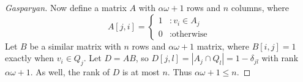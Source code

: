 \documentclass[12pt, a4paper]{book}
\theoremstyle{nonumberplain}
\newtheorem{proof}{Proof}
\begin{document}
\begin{proof}[Gasparyan]
    Now define a matrix $A$ with $\alpha\omega+1$ rows and $n$ columns, where
    \[A[j,i]=
        \begin{cases}
            1 &: v_i\in A_j\\
            0 &:\text{otherwise}
        \end{cases}
    \]
    Let $B$ be a similar matrix with $n$ rows and $\alpha\omega+1$ matrix, where $B[i,j]=1$ exactly when $v_i\in Q_j$.
    Let $D=AB$, so $D[j,l]=|A_j\cap Q_l|=1-\delta_{jl}$ with rank $\alpha\omega+1$.
    As well, the rank of $D$ is at most $n$.
    Thus $\alpha\omega+1\leq n$.
\end{proof}
\end{document}
